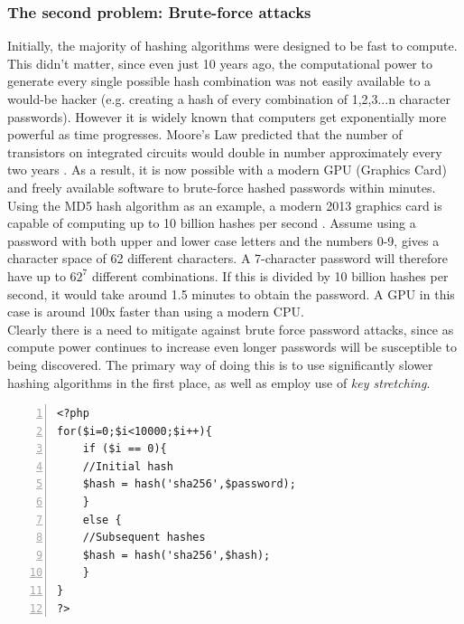 \documentclass[11pt]{article}
\begin{document}
\subsubsection{The second problem: Brute-force attacks}
Initially, the majority of hashing algorithms were designed to be fast to compute. This didn't matter, since even just 10 years ago, the computational power to generate every single possible hash combination  was not easily available to a would-be hacker (e.g. creating a hash of every combination of 1,2,3...n character passwords). However it is widely known that computers get exponentially more powerful as time progresses. Moore's Law predicted that the number of transistors on integrated circuits would double in number approximately every two years \cite{moore1965law}. As a result, it is now possible with a modern GPU (Graphics Card) and freely available software to brute-force hashed passwords within minutes.
\\ \indent
Using the MD5 hash algorithm as an example, a modern 2013 graphics card is capable of computing up to 10 billion hashes per second \cite[actual benchmark results]{oclhashcat}. Assume using a password with both upper and lower case letters and the numbers 0-9, gives a character space of 62 different characters. A 7-character password will therefore have up to \(62^7\) different combinations. If this is divided by 10 billion hashes per second, it would take around 1.5 minutes to obtain the password. A GPU in this case is around 100x faster than using a modern CPU.
\\ \indent
Clearly there is a need to mitigate against brute force password attacks, since as compute power continues to increase even longer passwords will be susceptible to being discovered. The primary way of doing this is to use significantly slower hashing algorithms in the first place, as well as employ use of \textit{key stretching}.


\begin{lstlisting}[float=ht,numbers=left,frame=lines,caption="Example code for key stretching on SHA-256 algorithm",label=stretching,showstringspaces=false]
<?php
for($i=0;$i<10000;$i++){
    if ($i == 0){
    //Initial hash
    $hash = hash('sha256',$password);
    } 
    else {
    //Subsequent hashes
    $hash = hash('sha256',$hash);
    }
}
?>

\end{lstlisting}
\end{document}
